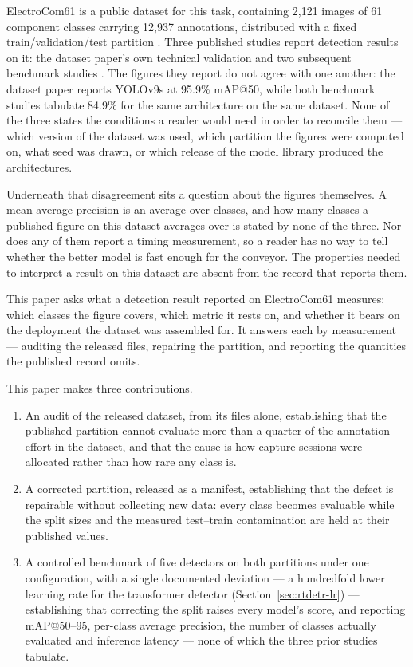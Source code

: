 ElectroCom61 is a public dataset for this task, containing 2{,}121 images of 61
component classes carrying 12{,}937 annotations, distributed with a fixed
train/validation/test partition \citep{electrocom61}. Three published studies
report detection results on it: the dataset paper's own technical validation and
two subsequent benchmark studies \citep{yolov12paper,yolov13paper}. The figures
they report do not agree with one another: the dataset paper reports YOLOv9s at
95.9\% mAP@50, while both benchmark studies tabulate 84.9\% for the same
architecture on the same dataset. None of the three states the conditions a
reader would need in order to reconcile them --- which version of the dataset
was used, which partition the figures were computed on, what seed was drawn, or
which release of the model library produced the architectures.

Underneath that disagreement sits a question about the figures themselves. A mean
average precision is an average over classes, and how many classes a published
figure on this dataset averages over is stated by none of the three. Nor does
any of them report a timing measurement, so a reader has no way to tell
whether the better model is fast enough for the conveyor. The properties needed
to interpret a result on this dataset are absent from the record that reports
them.

This paper asks what a detection result reported on ElectroCom61 measures: which
classes the figure covers, which metric it rests on, and whether it bears on the
deployment the dataset was assembled for. It answers each by measurement ---
auditing the released files, repairing the partition, and reporting the
quantities the published record omits.

This paper makes three contributions.

\begin{enumerate}
  \item An audit of the released dataset, from its files alone, establishing
    that the published partition cannot evaluate more than a quarter of the
    annotation effort in the dataset, and that the cause is how capture sessions
    were allocated rather than how rare any class is.
  \item A corrected partition, released as a manifest, establishing that the
    defect is repairable without collecting new data: every class becomes
    evaluable while the split sizes and the measured test--train contamination
    are held at their published values.
  \item A controlled benchmark of five detectors on both partitions under one
    configuration, with a single documented deviation --- a hundredfold lower
    learning rate for the transformer detector (Section~\ref{sec:rtdetr-lr}) ---
    establishing that correcting the split raises every model's score, and
    reporting mAP@50--95, per-class average precision, the number of classes
    actually evaluated and inference latency ---
    none of which the three prior studies tabulate.
\end{enumerate}

